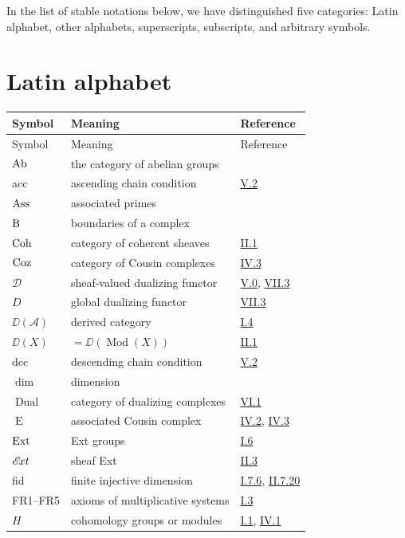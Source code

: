 In the list of stable notations below, we have distinguished five categories: Latin alphabet, other alphabets, superscripts, subscripts, and arbitrary symbols.

\section*{Latin alphabet}
\begin{longtable}{@{}l p{8cm} l@{}}
	\toprule
	Symbol & Meaning & Reference \\
	\midrule
	\endfirsthead
	\midrule
	Symbol & Meaning & Reference \\
	\midrule
	\endhead
	\bottomrule
	\endfoot
	$\operatorname{Ab}$ & the category of abelian groups & \\
	acc & ascending chain condition & \hyperref[sec:5.2]{V.2} \\
	$\operatorname{Ass}$ & associated primes & \\
	$\operatorname{B}$ & boundaries of a complex & \\
	$\operatorname{Coh}$ & category of coherent sheaves & \hyperref[sec:2.1]{II.1} \\
	$\operatorname{Coz}$ & category of Cousin complexes & \hyperref[sec:4.3]{IV.3} \\
	$\mathscr{D}$ & sheaf-valued dualizing functor & \hyperref[sec:5.0]{V.0}, \hyperref[sec:7.3]{VII.3} \\
	$D$ & global dualizing functor & \hyperref[sec:7.3]{VII.3} \\
	$\DD(\mathcal{A})$ & derived category & \hyperref[sec:1.4]{I.4} \\
	$\DD(X)$ & $=\DD(\operatorname{Mod}(X))$ & \hyperref[sec:2.1]{II.1} \\
	dcc & descending chain condition & \hyperref[sec:5.2]{V.2} \\
	$\dim$ & dimension & \\
	$\operatorname{Dual}$ & category of dualizing complexes & \hyperref[sec:6.1]{VI.1} \\
	$\operatorname{E}$ & associated Cousin complex & \hyperref[sec:4.2]{IV.2}, \hyperref[sec:4.3]{IV.3} \\
	$\operatorname{Ext}$ & Ext groups & \hyperref[sec:1.6]{I.6} \\
	$\mathop{\mathscr{E}\!xt}\nolimits$ & sheaf Ext & \hyperref[sec:2.3]{II.3} \\
	fid & finite injective dimension & \hyperref[prop:1.7.6]{I.7.6}, \hyperref[prop:2.7.20]{II.7.20} \\
	FR1--FR5 & axioms of multiplicative systems & \hyperref[sec:1.3]{I.3} \\
	$H$ & cohomology groups or modules & \hyperref[sec:1.1]{I.1}, \hyperref[sec:4.1]{IV.1} \\

\end{longtable}
